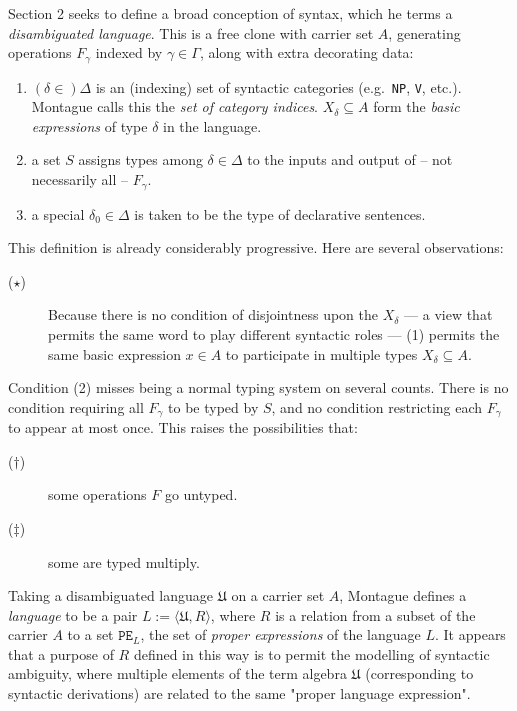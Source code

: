 Section 2 seeks to define a broad conception of syntax, which he terms a \emph{disambiguated language}. This is a free clone with carrier set $A$, generating operations $F_\gamma$ indexed by $\gamma \in \Gamma$, along with extra decorating data:

\begin{enumerate}
\item{$(\delta \in) \Delta$ is an (indexing) set of syntactic categories (e.g.~\texttt{NP}, \texttt{V}, etc.). Montague calls this the \emph{set of category indices}. $X_\delta \subseteq A$ form the \emph{basic expressions} of type $\delta$ in the language.}
\item{a set $S$ assigns types among $\delta \in \Delta$ to the inputs and output of -- not necessarily all -- $F_\gamma$.}
\item{a special $\delta_0 \in \Delta$ is taken to be the type of declarative sentences.}
\end{enumerate}

This definition is already considerably progressive. Here are several observations:

\begin{description}
\item[($\star$)]{Because there is no condition of disjointness upon the $X_\delta$ --- a view that permits the same word to play different syntactic roles --- (1) permits the same basic expression $x \in A$ to participate in multiple types $X_\delta \subseteq A$.}
\end{description}

Condition (2) misses being a normal typing system on several counts. There is no condition requiring all $F_\gamma$ to be typed by $S$, and no condition restricting each $F_\gamma$ to appear at most once. This raises the possibilities that:

\begin{description}
\item[($\dag$)] some operations $F$ go untyped.
\item[($\ddag$)] some are typed multiply.
\end{description}

Taking a disambiguated language $\mathfrak{U}$ on a carrier set $A$, Montague defines a \emph{language} to be a pair $L := \langle \mathfrak{U}, R \rangle$, where $R$ is a relation from a subset of the carrier $A$ to a set $\texttt{PE}_L$, the set of \emph{proper expressions} of the language $L$. It appears that a purpose of $R$ defined in this way is to permit the modelling of syntactic ambiguity, where multiple elements of the term algebra $\mathfrak{U}$ (corresponding to syntactic derivations) are related to the same "proper language expression".\\

